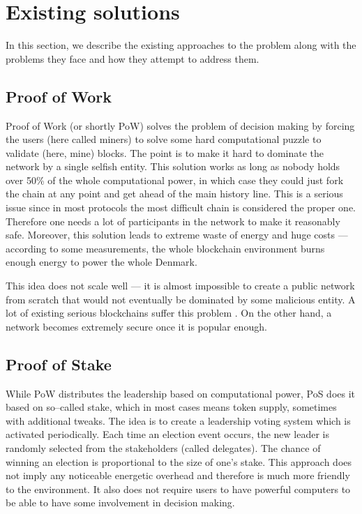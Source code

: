 \section{Existing solutions}

In this section, we describe the existing approaches to the problem along
with the problems they face and how they attempt to address them.

\subsection{Proof of Work}

Proof of Work (or shortly PoW) solves the problem of decision making by forcing the
users (here called miners) to solve some hard computational puzzle to validate
(here, mine) blocks\cite{bitcoin}.
The point is to make it hard to dominate the network by a
single selfish entity. This solution works as long as nobody holds over 50\% of the whole
computational power, in which case they could just fork the chain at any point
and get ahead of the main history line. This is a serious issue since in most
protocols the most difficult chain is considered the proper one. Therefore one needs a
lot of participants in the network to make it reasonably safe. Moreover, this
solution leads to extreme waste of energy and huge costs — according to some
measurements, the whole blockchain environment burns enough energy to power
the whole Denmark\cite{bitcoin_energy}.

This idea does not scale well — it is almost impossible to create a public
network from scratch that would not eventually be dominated by some malicious
entity. A lot of existing serious blockchains suffer this problem
\cite{51attack}. On the other hand, a network becomes extremely secure once
it is popular enough.

\subsection{Proof of Stake}

While PoW distributes the leadership based on computational power, PoS does it
based on so–called stake, which in most cases means token supply, sometimes
with additional tweaks\cite{peercoin}\cite{cryptocurr_without_pow}.
The idea is to create a leadership voting system
which is activated periodically. Each time an election event occurs,
the new leader is randomly selected from the stakeholders (called delegates).
The chance of winning an election is proportional to the size of one's stake.
This approach does
not imply any noticeable energetic overhead and therefore is much more friendly to the
environment. It also does not require users to have powerful computers to be able to
have some involvement in decision making.

